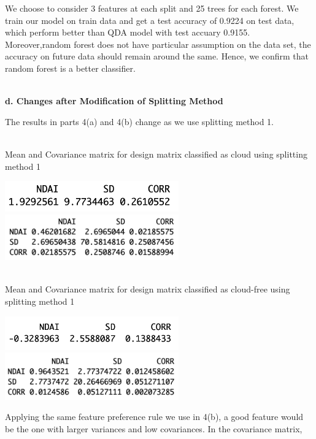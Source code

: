 \documentclass[11pt]{article}
\begin{document}
We choose to consider 3 features at each split and 25 trees for each forest. We train our model on train data and get a test accuracy of 0.9224 on test data, which perform better than QDA model with test accuary 0.9155. Moreover,random forest does not have particular assumption on the data set, the accuracy on future data should remain around the same. Hence, we confirm that random forest is a better classifier. 

\vspace{0.3cm}
\mbox{}\\
\textbf{d. Changes after Modification of Splitting Method}

The results in parts 4(a) and 4(b) change as we use splitting method 1.  

\mbox{}\\
Mean and Covariance matrix for design matrix classified as cloud using splitting method 1

\includegraphics[width = 7.5cm]{4(d)1}
\includegraphics[width = 7.5cm]{4(d)2}

\mbox{}\\
Mean and Covariance matrix for design matrix classified as cloud-free using splitting method 1

\includegraphics[width = 7.5cm]{4(d)3}
\includegraphics[width = 7.5cm]{4(d)4}

Applying the same feature preference rule we use in 4(b), a good feature would be the one with larger variances and low covariances. In the covariance matrix, 
\end{document}
